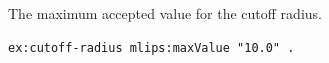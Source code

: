 The maximum accepted value for the cutoff radius.
\begin{lstlisting}[language=turtle]
ex:cutoff-radius mlips:maxValue "10.0" .
\end{lstlisting}
